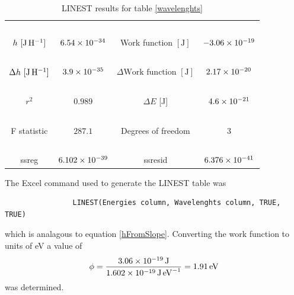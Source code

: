 \documentclass{article}[12pt]
\newcommand{\thline}{\hline ~ & ~ & ~ & ~ \\[-2ex] }
\begin{document}
            {\small \begin{table}[!h]
                \centering
                \begin{tabular}[center]{|c|c||c|c|}
                    \thline
                    $h \ [\unit{\J\per\H}]$ & $\num{6.54E-34}$ & Work function $[\unit{\J}]$ & $\num{-3.06E-19}$ \\ \thline
                    $\Delta h \ [\unit{\J\per\H}]$ & $\num{3.9E-35}$ & $\Delta \text{Work function }[\unit{\J}]$ & $\num{2.17E-20}$ \\
                    \thline
                    $r^2$ & $0.989$ & $\Delta E$ [J] & $\num{4.6E-21}$ \\
                    \thline
                    F statistic & $\num{287.1}$ & Degrees of freedom & $\num{3}$ \\
                    \thline 
                    ssreg & $\num{6.102E-39}$ & ssresid & $\num{6.376E-41}$ \\
                    \hline
                \end{tabular}
                \caption{LINEST results for table \ref{wavelenghts}}\label{wavelenghtLINEST}
            \end{table}}
        \normalsize
        The Excel command used to generate the LINEST table was
            \begin{lstlisting}
                LINEST(Energies column, Wavelenghts column, TRUE, TRUE)
            \end{lstlisting}
        which is analagous to equation \ref{hFromSlope}. Converting the work function to units of eV a value of 
            \[\phi = \frac {\qty{3.06E-19}{\J}}{\qty{1.602E-19}{\J\per\eV}} = \qty{1.91}{\eV}\]
        was determined.

        \FloatBarrier %
\end{document}

